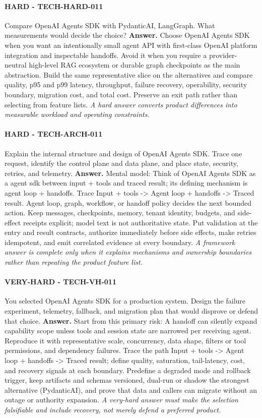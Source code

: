 \paragraph{HARD - TECH-HARD-011} Compare OpenAI Agents SDK with PydanticAI, LangGraph. What measurements would decide the choice?
\textbf{Answer.} Choose OpenAI Agents SDK when you want an intentionally small agent API with first-class OpenAI platform integration and inspectable handoffs. Avoid it when you require a provider-neutral high-level RAG ecosystem or durable graph checkpoints as the main abstraction. Build the same representative slice on the alternatives and compare quality, p95 and p99 latency, throughput, failure recovery, operability, security boundary, migration cost, and total cost. Preserve an exit path rather than selecting from feature lists.
\textit{A hard answer converts product differences into measurable workload and operating constraints.}
\paragraph{HARD - TECH-ARCH-011} Explain the internal structure and design of OpenAI Agents SDK. Trace one request, identify the control plane and data plane, and place state, security, retries, and telemetry.
\textbf{Answer.} Mental model: Think of OpenAI Agents SDK as a agent sdk between input + tools and traced result; its defining mechanism is agent loop + handoffs. Trace Input + tools -> Agent loop + handoffs -> Traced result. Agent loop, graph, workflow, or handoff policy decides the next bounded action. Keep messages, checkpoints, memory, tenant identity, budgets, and side-effect receipts explicit; model text is not authoritative state. Put validation at the entry and result contracts, authorize immediately before side effects, make retries idempotent, and emit correlated evidence at every boundary.
\textit{A framework answer is complete only when it explains mechanisms and ownership boundaries rather than repeating the product feature list.}
\paragraph{VERY-HARD - TECH-VH-011} You selected OpenAI Agents SDK for a production system. Design the failure experiment, telemetry, fallback, and migration plan that would disprove or defend that choice.
\textbf{Answer.} Start from this primary risk: A handoff can silently expand capability scope unless tools and session state are narrowed per receiving agent. Reproduce it with representative scale, concurrency, data shape, filters or tool permissions, and dependency failures. Trace the path Input + tools -> Agent loop + handoffs -> Traced result; define quality, saturation, tail-latency, cost, and recovery signals at each boundary. Predefine a degraded mode and rollback trigger, keep artifacts and schemas versioned, dual-run or shadow the strongest alternative (PydanticAI), and prove that data and callers can migrate without an outage or authority expansion.
\textit{A very-hard answer must make the selection falsifiable and include recovery, not merely defend a preferred product.}
